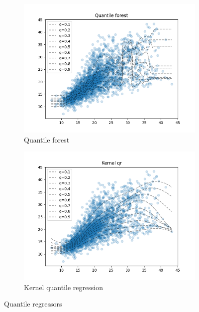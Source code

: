 \begin{figure}[!h]
\begin{subfigure}[b]{0.5\linewidth}
      \vspace{4ex}
    \end{subfigure} 
    \begin{subfigure}[b]{0.5\linewidth}
      \centering
      \includegraphics[width=1.1\textwidth]{images/melbourne_quantile_forest.png} 
      \caption{Quantile forest} 
      \label{fig:melbourne_quantile_forest} 
    \end{subfigure}%
    \begin{subfigure}[b]{0.5\linewidth}
      \centering
      \includegraphics[width=1.1\textwidth]{images/melborune_kernel_quantile_regression.png} 
      \caption{Kernel quantile regression} 
      \label{fig:melborune_kernel_quantile_regression} 
    \end{subfigure} 
    \caption{Quantile regressors}
    \label{fig:melbourne_quantiles_comparison} 
  \end{figure}

